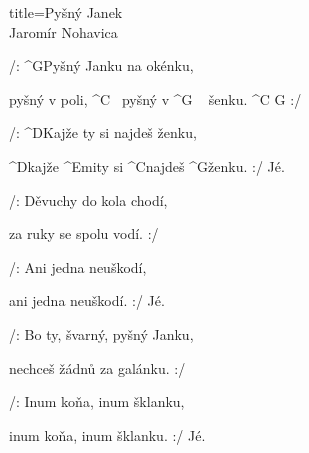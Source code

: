 \begin{song}{title=\predtitle\centering Pyšný Janek \\\large Jaromír Nohavica  \vspace*{-0.3cm}}  %
\begin{centerjustified}
\nejnejvetsi

\sloka 
	/: ^{G{\z}}Pyšný Janku na okénku,

	pyšný v poli, ^{C\,\,\,\,\,}pyšný v ^{G\,\,\,\,\,\,\,}šenku. ^{C\,\,G} :/
	
	/: ^{D{\z}}Kajže ty si najdeš ženku,
	
	^{D{\z}}kajže ^{Emi}ty si ^{C{\z}}najdeš ^{G}ženku. :/ Jé.

\sloka
	/: Děvuchy do kola chodí,

	za ruky se spolu vodí. :/
	
	/: Ani jedna neuškodí,
	
	ani jedna neuškodí. :/ Jé.

\sloka
	/: Bo ty, švarný, pyšný Janku,
	
	nechceš žádnů za galánku. :/
	
	/: Inum koňa, inum šklanku,

	inum koňa, inum šklanku. :/ Jé.

\end{centerjustified}
\setcounter{Slokočet}{0}
\end{song}
